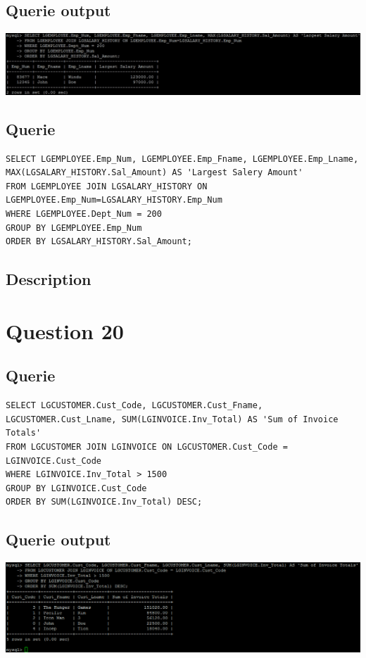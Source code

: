 \documentclass[a4paper,10pt]{article}
\begin{document}
\subsection{Querie output}
           \includegraphics{Queries/Question_16_(19)/Q16_screenshot.jpg}
 \subsection{Querie}
          \lstset{
            language=SQL,
            breaklines=true
            }
        \begin{lstlisting}[frame=single]
        SELECT LGEMPLOYEE.Emp_Num, LGEMPLOYEE.Emp_Fname, LGEMPLOYEE.Emp_Lname, MAX(LGSALARY_HISTORY.Sal_Amount) AS 'Largest Salery Amount'
FROM LGEMPLOYEE JOIN LGSALARY_HISTORY ON LGEMPLOYEE.Emp_Num=LGSALARY_HISTORY.Emp_Num
WHERE LGEMPLOYEE.Dept_Num = 200
GROUP BY LGEMPLOYEE.Emp_Num
ORDER BY LGSALARY_HISTORY.Sal_Amount;

        \end{lstlisting}
\subsection{Description}\section*{Question 20}
 \subsection{Querie}
          \lstset{
            language=SQL,
            breaklines=true
            }
        \begin{lstlisting}[frame=single]
        SELECT LGCUSTOMER.Cust_Code, LGCUSTOMER.Cust_Fname, LGCUSTOMER.Cust_Lname, SUM(LGINVOICE.Inv_Total) AS 'Sum of Invoice Totals'
FROM LGCUSTOMER JOIN LGINVOICE ON LGCUSTOMER.Cust_Code = LGINVOICE.Cust_Code
WHERE LGINVOICE.Inv_Total > 1500
GROUP BY LGINVOICE.Cust_Code
ORDER BY SUM(LGINVOICE.Inv_Total) DESC;

        \end{lstlisting}
\subsection{Querie output}
           \includegraphics{Queries/Question_20/Question_20_screenshot.PNG}
\end{document}
